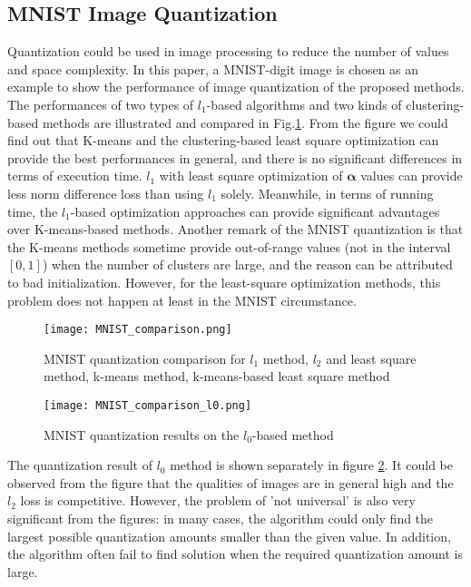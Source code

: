 \documentclass[preprint,10pt]{elsarticle}
\begin{document}
\subsection{MNIST Image Quantization}
Quantization could be used in image processing to reduce the number of values and space complexity. In this paper, a MNIST-digit image is chosen as an example to show the performance of image quantization of the proposed methods. The performances of two types of $l_1$-based algorithms and two kinds of clustering-based methods are illustrated and compared in Fig$.$\ref{fig:MNISTcomparison}. From the figure we could find out that K-means and the clustering-based least square optimization can provide the best performances in general, and there is no significant differences in terms of execution time. $l_1$ with least square optimization of $\boldsymbol{\alpha}$ values can provide less norm difference loss than using $l_1$ solely. Meanwhile, in terms of running time, the $l_1$-based optimization approaches can provide significant advantages over K-means-based methods. Another remark of the MNIST quantization is that the K-means methods sometime provide out-of-range values (not in the interval $[0,1]$) when the number of clusters are large, and the reason can be attributed to bad initialization. However, for the least-square optimization methods, this problem does not happen at least in the MNIST circumstance.\par
\begin{figure}
\centering 
\texttt{[image: MNIST\_comparison.png]}
\caption{MNIST quantization comparison for $l_1$ method, $l_2$ and least square method, k-means method, k-means-based least square method}
\label{fig:MNISTcomparison}
\end{figure}
\begin{figure}[t]
\centering
\texttt{[image: MNIST\_comparison\_l0.png]}
\caption{MNIST quantization results on the $l_0$-based method}
\label{fig:MNISTL0Result}
\end{figure}
The quantization result of $l_0$ method is shown separately in figure \ref{fig:MNISTL0Result}. It could be observed from the figure that the qualities of images are in general high and the $l_2$ loss is competitive. However, the problem of 'not universal' is also very significant from the figures: in many cases, the algorithm could only find the largest possible quantization amounts smaller than the given value. In addition, the algorithm often fail to find solution when the required quantization amount is large.
\end{document}
